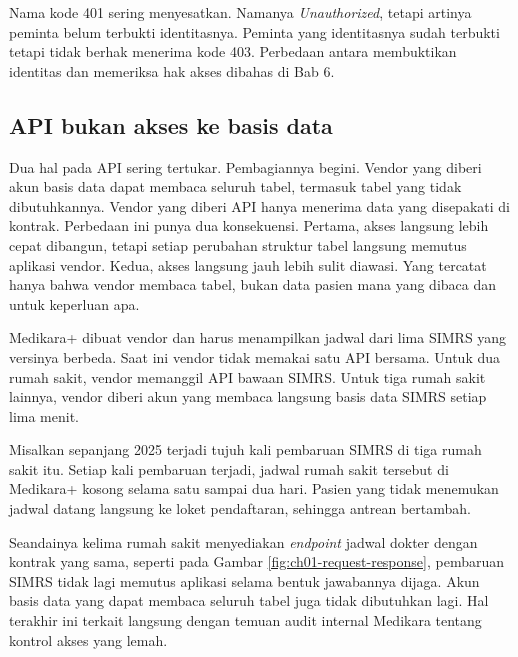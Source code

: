 Nama kode 401 sering menyesatkan. Namanya \textit{Unauthorized}, tetapi artinya
peminta belum terbukti identitasnya. Peminta yang identitasnya sudah terbukti
tetapi tidak berhak menerima kode 403. Perbedaan antara membuktikan identitas dan
memeriksa hak akses dibahas di Bab 6.

\subsection*{API bukan akses ke basis data}

Dua hal pada API sering tertukar. Pembagiannya begini. Vendor yang diberi akun
basis data dapat membaca seluruh tabel, termasuk tabel yang tidak dibutuhkannya.
Vendor yang diberi API hanya menerima data yang disepakati di kontrak. Perbedaan
ini punya dua konsekuensi. Pertama, akses langsung lebih cepat dibangun, tetapi
setiap perubahan struktur tabel langsung memutus aplikasi vendor. Kedua, akses
langsung jauh lebih sulit diawasi. Yang tercatat hanya bahwa vendor membaca
tabel, bukan data pasien mana yang dibaca dan untuk keperluan apa.

\begin{kasus}[title={Kasus Medikara Health: Medikara+ Meminta Jadwal Dokter ke SIMRS}]
Medikara+ dibuat vendor dan harus menampilkan jadwal dari lima SIMRS yang
versinya berbeda. Saat ini vendor tidak memakai satu API bersama. Untuk dua rumah
sakit, vendor memanggil API bawaan SIMRS. Untuk tiga rumah sakit lainnya, vendor
diberi akun yang membaca langsung basis data SIMRS setiap lima menit.

Misalkan sepanjang 2025 terjadi tujuh kali pembaruan SIMRS di tiga rumah sakit
itu. Setiap kali pembaruan terjadi, jadwal rumah sakit tersebut di Medikara+
kosong selama satu sampai dua hari. Pasien yang tidak menemukan jadwal datang
langsung ke loket pendaftaran, sehingga antrean bertambah.

Seandainya kelima rumah sakit menyediakan \textit{endpoint} jadwal dokter dengan
kontrak yang sama, seperti pada Gambar \ref{fig:ch01-request-response},
pembaruan SIMRS tidak lagi memutus aplikasi selama bentuk jawabannya dijaga.
Akun basis data yang dapat membaca seluruh tabel juga tidak dibutuhkan lagi. Hal
terakhir ini terkait langsung dengan temuan audit internal Medikara tentang
kontrol akses yang lemah.
\end{kasus}

